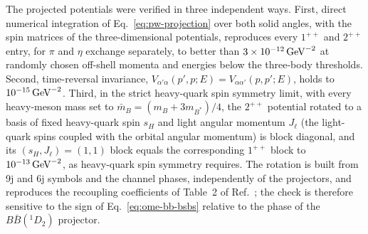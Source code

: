The projected potentials were verified in three independent ways.
First, direct numerical integration of Eq.~\eqref{eq:pw-projection} over
both solid angles, with the spin matrices of the three-dimensional
potentials, reproduces every $1^{++}$ and $2^{++}$ entry, for $\pi$ and
$\eta$ exchange separately, to better than $3\times10^{-12}\,\mathrm{GeV}^{-2}$ at
randomly chosen off-shell momenta and energies below the three-body
thresholds.
Second, time-reversal invariance,
$V_{\alpha'\alpha}(p',p;E)=V_{\alpha\alpha'}(p,p';E)$, holds to
$10^{-15}\,\mathrm{GeV}^{-2}$.
Third, in the strict heavy-quark spin symmetry limit, with every heavy-meson
mass set to $\bar m_B=(m_B+3m_{B^*})/4$, the $2^{++}$ potential rotated to a
basis of fixed heavy-quark spin $s_H$ and light angular momentum $J_\ell$
(the light-quark spins coupled with the orbital angular momentum) is block
diagonal, and its $(s_H,J_\ell)=(1,1)$ block equals the corresponding
$1^{++}$ block to $10^{-13}\,\mathrm{GeV}^{-2}$, as heavy-quark spin symmetry
requires. The rotation is built from 9j and 6j symbols and the channel
phases, independently of the projectors, and reproduces the recoupling
coefficients of Table~2 of Ref.~\cite{Bruschini:2023zkb}; the check is
therefore sensitive to the sign of Eq.~\eqref{eq:ome-bb-bsbs} relative to
the phase of the $B\bar B({}^1D_2)$ projector.
